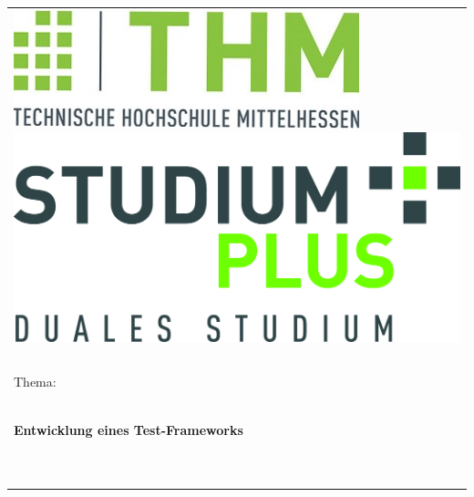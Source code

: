 \begin{center}
\begin{tabular}{p{\textwidth}}



\includegraphics[scale=0.4]{img/thm.jpg}
\hspace{\fill}
\includegraphics[scale=0.035]{img/studiumplus.png}


\\

\begin{center}
\large{Projektstudiumbericht \\}
\end{center}

\\

\begin{center}
Thema:
\end{center}

\\

\begin{center}
\textbf{\Large{Entwicklung eines Test-Frameworks}}
\end{center}

\\
\\
\\
\\
\\
\\
\\

\begin{center}


\end{center}
\end{tabular}
\end{center}
